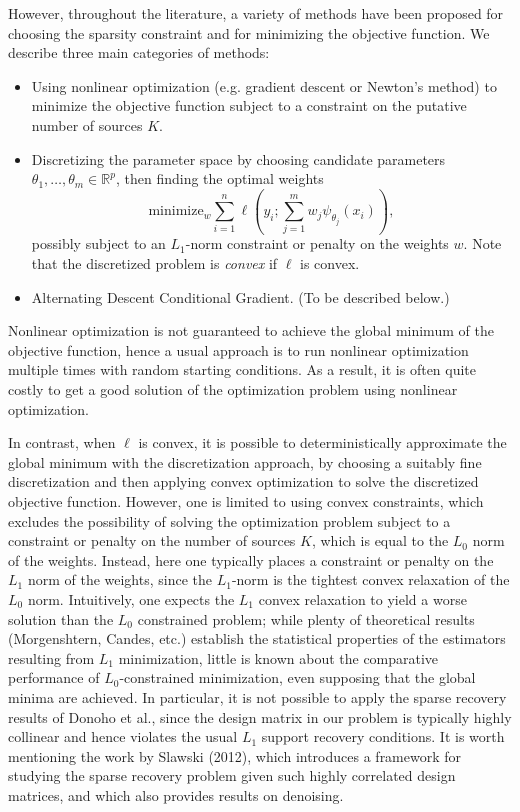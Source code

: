 \documentclass[11pt]{article}
\begin{document}
However, throughout the literature, a variety of methods have been
proposed for choosing the sparsity constraint and for minimizing the
objective function.  We describe three main categories of methods:
\begin{itemize}
\item Using nonlinear optimization (e.g. gradient descent or Newton's
  method) to minimize the objective function subject to a constraint
  on the putative number of sources $K$.
\item Discretizing the parameter space by choosing candidate
  parameters $\theta_1,\hdots, \theta_m \in \mathbb{R}^p$, then finding the optimal weights
\[
\text{minimize}_w \sum_{i=1}^n \ell\left(y_i; \sum_{j=1}^m w_j \psi_{\theta_j}(x_i) \right),
\]
possibly subject to an $L_1$-norm constraint or penalty on the weights $w$.
Note that the discretized problem is \emph{convex} if $\ell$ is convex.
\item Alternating Descent Conditional Gradient.  (To be described below.)
\end{itemize}

Nonlinear optimization is not guaranteed to achieve the global minimum
of the objective function, hence a usual approach is to run nonlinear
optimization multiple times with random starting conditions.  As a
result, it is often quite costly to get a good solution of the
optimization problem using nonlinear optimization.

In contrast, when $\ell$ is convex, it is possible to
deterministically approximate the global minimum with the
discretization approach, by choosing a suitably fine discretization
and then applying convex optimization to solve the discretized
objective function.  However, one is limited to using convex
constraints, which excludes the possibility of solving the
optimization problem subject to a constraint or penalty on the number
of sources $K$, which is equal to the $L_0$ norm of the weights.
Instead, here one typically places a constraint or penalty on the
$L_1$ norm of the weights, since the $L_1$-norm is the tightest convex
relaxation of the $L_0$ norm.  Intuitively, one expects the $L_1$
convex relaxation to yield a worse solution than the $L_0$ constrained
problem; while plenty of theoretical results (Morgenshtern, Candes,
etc.) establish the statistical properties of the estimators resulting
from $L_1$ minimization, little is known about the comparative
performance of $L_0$-constrained minimization, even supposing that the
global minima are achieved.  In particular, it is not possible to
apply the sparse recovery results of Donoho et al., since the design
matrix in our problem is typically highly collinear and hence violates
the usual $L_1$ support recovery conditions.  It is worth mentioning
the work by Slawski (2012), which introduces a framework for studying
the sparse recovery problem given such highly correlated design
matrices, and which also provides results on denoising.
\end{document}
